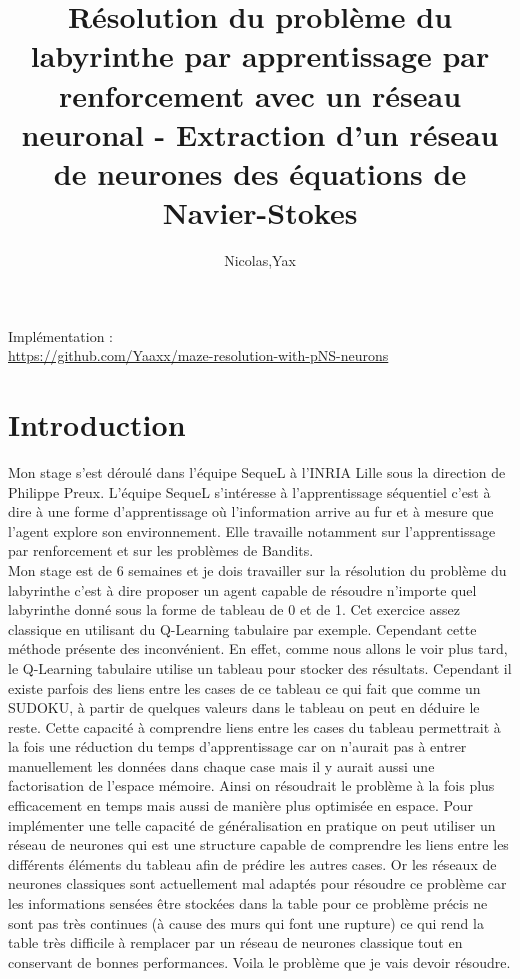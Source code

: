 \documentclass[10pt]{article}
\title{Résolution du problème du labyrinthe par apprentissage par renforcement avec un réseau neuronal - Extraction d'un réseau de neurones des équations de Navier-Stokes}
\begin{document}
\author{Nicolas,Yax}
\maketitle

Implémentation : \\
\url{https://github.com/Yaaxx/maze-resolution-with-pNS-neurons}

\section{Introduction}
Mon stage s'est déroulé dans l'équipe SequeL à l'INRIA Lille sous la direction de Philippe Preux. L'équipe SequeL s'intéresse à l'apprentissage séquentiel c'est à dire à une forme d'apprentissage où l'information arrive au fur et à mesure que l'agent explore son environnement. Elle travaille notamment sur l'apprentissage par renforcement et sur les problèmes de Bandits.\\
Mon stage est de 6 semaines et je dois travailler sur la résolution du problème du labyrinthe c'est à dire proposer un agent capable de résoudre n'importe quel labyrinthe donné sous la forme de tableau de 0 et de 1. Cet exercice assez classique en utilisant du Q-Learning tabulaire par exemple. Cependant cette méthode présente des inconvénient. En effet, comme nous allons le voir plus tard, le Q-Learning tabulaire utilise un tableau pour stocker des résultats. Cependant il existe parfois des liens entre les cases de ce tableau ce qui fait que comme un SUDOKU, à partir de quelques valeurs dans le tableau on peut en déduire le reste. Cette capacité à comprendre liens entre les cases du tableau permettrait à la fois une réduction du temps d'apprentissage car on n'aurait pas à entrer manuellement les données dans chaque case mais il y aurait aussi une factorisation de l'espace mémoire. Ainsi on résoudrait le problème à la fois plus efficacement en temps mais aussi de manière plus optimisée en espace. Pour implémenter une telle capacité de généralisation en pratique on peut utiliser un réseau de neurones qui est une structure capable de comprendre les liens entre les différents éléments du tableau afin de prédire les autres cases. Or les réseaux de neurones classiques sont actuellement mal adaptés pour résoudre ce problème car les informations sensées être stockées dans la table pour ce problème précis ne sont pas très continues (à cause des murs qui font une rupture) ce qui rend la table très difficile à remplacer par un réseau de neurones classique tout en conservant de bonnes performances. Voila le problème que je vais devoir résoudre. 
\end{document}
